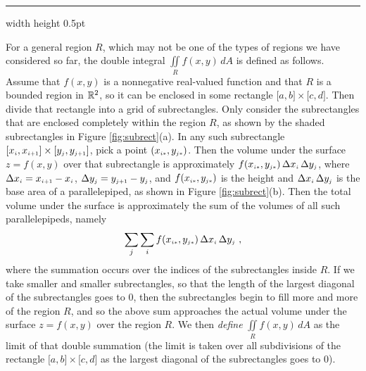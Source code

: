 \hrule width \textwidth height 0.5pt
\vspace{3mm}

For a general region $R$, which may not be one of the types of regions we have considered so far, the double integral
$\iint\limits_{R} f(x,y)\,dA$ is defined as follows. Assume that $f(x,y)$ is a nonnegative real-valued function
and that $R$ is a bounded region in $\mathbb{R}^{2}$, so it
can be enclosed in some rectangle $\lbrack a,b \rbrack \times \lbrack c,d \rbrack$. Then divide that rectangle
into a grid of subrectangles. Only consider the subrectangles that are enclosed completely within the region $R$, as
shown by the shaded subrectangles in Figure \ref{fig:subrect}(a). In any such subrectangle
$\lbrack x_{\scriptscriptstyle i},x_{\scriptscriptstyle i+1} \rbrack \times \lbrack y_{\scriptscriptstyle j},y_{\scriptscriptstyle j+1} \rbrack$, pick a point
$(x_{\scriptscriptstyle i*},y_{\scriptscriptstyle j*})$. Then the volume under the surface $z=f(x,y)$ over that subrectangle is approximately
$f(x_{\scriptscriptstyle i*},y_{\scriptscriptstyle j*})\,\Delta x_{\scriptscriptstyle i} \,\Delta y_{\scriptscriptstyle j}$, where $\Delta x_{\scriptscriptstyle i} = x_{\scriptscriptstyle i+1} -
x_{\scriptscriptstyle i}$, $\Delta y_{\scriptscriptstyle j} = y_{\scriptscriptstyle j+1} - y_{\scriptscriptstyle j}$, and $f(x_{\scriptscriptstyle i*},y_{\scriptscriptstyle j*})$ is the height
and $\Delta x_{\scriptscriptstyle i} \,\Delta y_{\scriptscriptstyle j}$ is the base area of a parallelepiped, as shown in Figure
\ref{fig:subrect}(b). Then the total volume under the surface is approximately the sum of the volumes of all such
parallelepipeds, namely
\begin{equation}\label{eqn:approxvol}
 \sum_j \sum_i f(x_{\scriptscriptstyle i*},y_{\scriptscriptstyle j*})\,\Delta x_{\scriptscriptstyle i} \,\Delta y_{\scriptscriptstyle j} ~,
\end{equation}
where the summation occurs over the indices of the subrectangles inside $R$. If we take smaller and smaller
subrectangles, so that the length of the largest diagonal of the subrectangles goes to $0$, then the subrectangles
begin to fill more and more of the region $R$, and so the above sum approaches
the actual volume under the surface $z=f(x,y)$ over the region $R$. We then \emph{define}
$\iint\limits_{R} f(x,y)\,dA$ as the limit of that double summation (the limit is taken over all subdivisions of the
rectangle $\lbrack a,b \rbrack \times \lbrack c,d \rbrack$ as the largest diagonal of the subrectangles goes to $0$).

